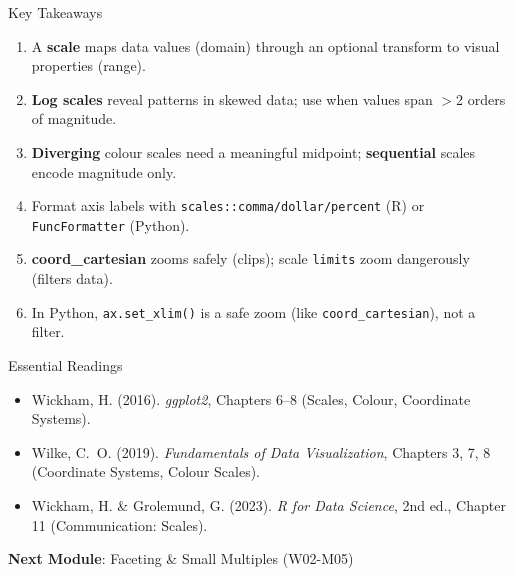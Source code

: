 \documentclass[10pt]{beamer}
\begin{document}
\begin{frame}{Key Takeaways}
  \begin{enumerate}
    \item A \textbf{scale} maps data values (domain) through an optional
          transform to visual properties (range).
    \item \textbf{Log scales} reveal patterns in skewed data; use when
          values span $>$2 orders of magnitude.
    \item \textbf{Diverging} colour scales need a meaningful midpoint;
          \textbf{sequential} scales encode magnitude only.
    \item Format axis labels with \texttt{scales::comma/dollar/percent}
          (R) or \texttt{FuncFormatter} (Python).
    \item \textbf{coord\_cartesian} zooms safely (clips); scale
          \texttt{limits} zoom dangerously (filters data).
    \item In Python, \texttt{ax.set\_xlim()} is a safe zoom (like
          \texttt{coord\_cartesian}), not a filter.
  \end{enumerate}
\end{frame}

\begin{frame}{Essential Readings}
  \begin{itemize}
    \item Wickham, H. (2016). \emph{ggplot2}, Chapters 6--8
          (Scales, Colour, Coordinate Systems).
    \item Wilke, C.~O. (2019). \emph{Fundamentals of Data Visualization},
          Chapters 3, 7, 8 (Coordinate Systems, Colour Scales).
    \item Wickham, H. \& Grolemund, G. (2023). \emph{R for Data Science},
          2nd ed., Chapter 11 (Communication: Scales).
  \end{itemize}
  \vspace{6pt}
  \textbf{Next Module}: Faceting \& Small Multiples (W02-M05)
\end{frame}
\end{document}
